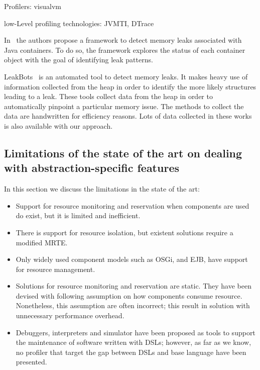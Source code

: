 Profilers: visualvm

low-Level profiling technologies: JVMTI, DTrace

In~\cite{Xu:2013:PML:2491509.2491511} the authors propose a framework to detect memory leaks associated with Java containers.
To do so, the framework explores the status of each container object with the goal of identifying leak patterns.

LeakBots~\cite{Mitchell03leakbot:an} is an automated tool to detect memory leaks. It makes heavy
use of information collected from the heap in order to identify the more likely structures leading to a leak.
These tools collect data from the heap in order to automatically pinpoint a particular memory issue.
The methods to collect the data are handwritten for efficiency reasons.
Lots of data collected in these works is also available with our approach.

\subsection{Limitations of the state of the art on dealing with abstraction-specific features}


In this section we discuss the limitations in the state of the art:

\begin{itemize}
\item Support for resource monitoring and reservation when components are used do exist, but it is limited and inefficient.

\item There is support for resource isolation, but existent solutions require a modified MRTE. 

\item Only widely used component models such as OSGi, and EJB, have support for resource management.

\item Solutions for resource monitoring and reservation are static.
They have been devised with following assumption on how components consume resource.
Nonetheless, this assumption are often incorrect; this result in solution with unnecessary performance overhead.

\item Debuggers, interpreters and simulator have been proposed as tools to support the maintenance of software written with DSLs; however, as far as we know, no profiler that target the gap between DSLs and base language have been presented.

\end{itemize}


